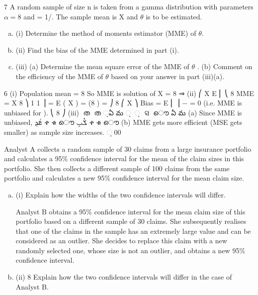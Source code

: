 \documentclass[a4paper,12pt]{article}
\begin{document}
\begin{enumerate}
7
A random sample of size n is taken from a gamma distribution with parameters $\alpha = 8$
and \lambda = 1/\theta. The sample mean is X and $\theta$ is to be estimated.
\begin{enumerate}[(a)]
\item (i) Determine the method of moments estimator (MME) of $\theta$. 
\item (ii) Find the bias of the MME determined in part (i). 
\item (iii) (a) Determine the mean square error of the MME of $\theta$ . (b) Comment on the efficiency of the MME of $\theta$ based on your answer in
part (iii)(a).
\end{enumerate}
6
(i)
Population mean = 8\theta
So MME is solution of X = 8 \theta ⇒
(ii)
⎛ X
E ⎜
⎝ 8
MME =
X
8
⎞ 1
1
⎟ = E ( X ) = (8 \theta ) = 
⎠ 8
⎛ X ⎞
Bias = E ⎜ ⎟ − \theta = 0 (i.e. MME is unbiased for \theta).
⎝ 8 ⎠
(iii)
௑ത ௑ത ଼ఏ మ
଼ ଼ ଺ସ௡
ൌ
ఏ మ
(a) Since MME is unbiased, ‫ܧܵܯ‬ ቀ ቁ ൌ ‫ݎܽݒ‬ ቀ ቁ ൌ
(b) MME gets more efficient (MSE gets smaller) as sample size increases.
଼௡00

\newpage
Analyst A collects a random sample of 30 claims from a large insurance portfolio and
calculates a 95\% confidence interval for the mean of the claim sizes in this portfolio.
She then collects a different sample of 100 claims from the same portfolio and
calculates a new 95\% confidence interval for the mean claim size.
\begin{enumerate}[(a)]
\item (i)
Explain how the widths of the two confidence intervals will differ.

Analyst B obtains a 95\% confidence interval for the mean claim size of this portfolio based on a different sample of 30 claims. She subsequently realises that one of the
claims in the sample has an extremely large value and can be considered as an outlier.
She decides to replace this claim with a new randomly selected one, whose size is not
an outlier, and obtains a new 95\% confidence interval.
\item (ii)
8
Explain how the two confidence intervals will differ in the case of Analyst B.
\end{enumerate}


\end{enumerate}
\end{document}
